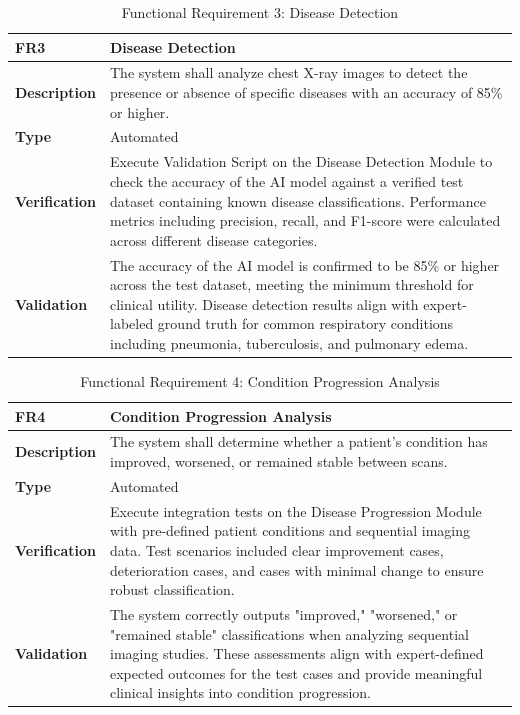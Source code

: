 \documentclass[12pt, titlepage]{article}
\begin{document}
\begin{table}[h!]
\centering
{}
\begin{tabular}{|p{3.5cm}|p{11.5cm}|}
\hline
\rowcolor{gray!30}
\textbf{FR3} & \textbf{Disease Detection} \\
\hline
\textbf{Description} & The system shall analyze chest X-ray images to detect the presence or absence of specific diseases with an accuracy of 85\% or higher. \\
\hline
\textbf{Type} & Automated \\
\hline
\textbf{Verification} & Execute Validation Script on the Disease Detection Module to check the accuracy of the AI model against a verified test dataset containing known disease classifications. Performance metrics including precision, recall, and F1-score were calculated across different disease categories. \\
\hline
\textbf{Validation} & The accuracy of the AI model is confirmed to be 85\% or higher across the test dataset, meeting the minimum threshold for clinical utility. Disease detection results align with expert-labeled ground truth for common respiratory conditions including pneumonia, tuberculosis, and pulmonary edema. \\
\hline
\end{tabular}
\caption{Functional Requirement 3: Disease Detection}
\end{table}

\begin{table}[h!]
\centering
{}
\begin{tabular}{|p{3.5cm}|p{11.5cm}|}
\hline
\rowcolor{gray!30}
\textbf{FR4} & \textbf{Condition Progression Analysis} \\
\hline
\textbf{Description} & The system shall determine whether a patient's condition has improved, worsened, or remained stable between scans.\\
\hline
\textbf{Type} & Automated \\
\hline
\textbf{Verification} & Execute integration tests on the Disease Progression Module with pre-defined patient conditions and sequential imaging data. Test scenarios included clear improvement cases, deterioration cases, and cases with minimal change to ensure robust classification. \\
\hline
\textbf{Validation} & The system correctly outputs "improved," "worsened," or "remained stable" classifications when analyzing sequential imaging studies. These assessments align with expert-defined expected outcomes for the test cases and provide meaningful clinical insights into condition progression. \\
\hline
\end{tabular}
\caption{Functional Requirement 4: Condition Progression Analysis}
\end{table}
\end{document}
